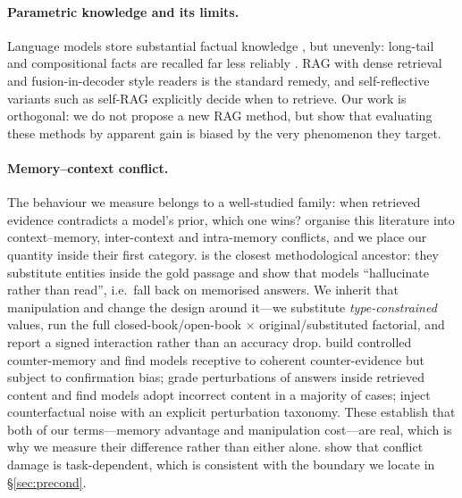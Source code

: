 \documentclass[11pt]{article}
\begin{document}
\paragraph{Parametric knowledge and its limits.}
Language models store substantial factual knowledge \citep{petroni2019,roberts2020}, but
unevenly: long-tail and compositional facts are recalled far less reliably
\citep{kandpal2023,mallen2023}. RAG \citep{lewis2020} with dense retrieval
\citep{karpukhin2020} and fusion-in-decoder style readers \citep{izacard2021} is the
standard remedy, and self-reflective variants such as self-{RAG} \citep{asai2024} explicitly
decide when to retrieve. Our work is orthogonal: we do not propose a new {RAG} method, but
show that evaluating these methods by apparent gain is biased by the very phenomenon they
target.

\paragraph{Memory--context conflict.}
The behaviour we measure belongs to a well-studied family: when retrieved evidence
contradicts a model's prior, which one wins? \citet{xu2024survey} organise this literature
into context--memory, inter-context and intra-memory conflicts, and we place our quantity
inside their first category. \citet{longpre2021entity} is the closest methodological
ancestor: they substitute entities inside the gold passage and show that models
``hallucinate rather than read'', i.e.\ fall back on memorised answers. We inherit that
manipulation and change the design around it---we substitute \emph{type-constrained} values,
run the full closed-book/open-book $\times$ original/substituted factorial, and report a
signed interaction rather than an accuracy drop. \citet{xie2024chameleon} build controlled
counter-memory and find models receptive to coherent counter-evidence but subject to
confirmation bias; \citet{wu2024clasheval} grade perturbations of answers inside retrieved
content and find models adopt incorrect content in a majority of cases;
\citet{hong2024gullible} inject counterfactual noise with an explicit perturbation taxonomy.
These establish that both of our terms---memory advantage and manipulation cost---are real,
which is why we measure their difference rather than either alone. \citet{sun2026taskmatters}
show that conflict damage is task-dependent, which is consistent with the boundary we
locate in \S\ref{sec:precond}.
\end{document}
